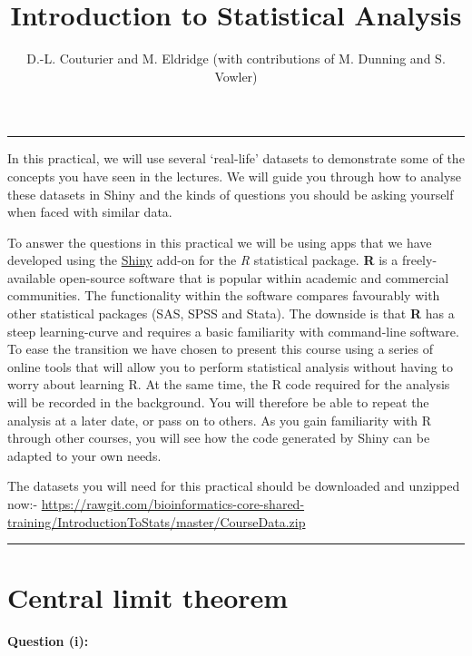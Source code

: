 \documentclass[]{article}
\title{Introduction to Statistical Analysis}
\author{D.-L. Couturier and M. Eldridge (with contributions of M. Dunning and S.
Vowler)}
\date{}
\begin{document}
\maketitle

{
\setcounter{tocdepth}{3}
\tableofcontents
}
\begin{center}\rule{0.5\linewidth}{\linethickness}\end{center}

In this practical, we will use several `real-life' datasets to
demonstrate some of the concepts you have seen in the lectures. We will
guide you through how to analyse these datasets in Shiny and the kinds
of questions you should be asking yourself when faced with similar data.

To answer the questions in this practical we will be using apps that we
have developed using the \href{http://shiny.rstudio.com/gallery/}{Shiny}
add-on for the \emph{R} statistical package. \textbf{R} is a
freely-available open-source software that is popular within academic
and commercial communities. The functionality within the software
compares favourably with other statistical packages (SAS, SPSS and
Stata). The downside is that \textbf{R} has a steep learning-curve and
requires a basic familiarity with command-line software. To ease the
transition we have chosen to present this course using a series of
online tools that will allow you to perform statistical analysis without
having to worry about learning R. At the same time, the R code required
for the analysis will be recorded in the background. You will therefore
be able to repeat the analysis at a later date, or pass on to others. As
you gain familiarity with R through other courses, you will see how the
code generated by Shiny can be adapted to your own needs.

The datasets you will need for this practical should be downloaded and
unzipped now:-
\url{https://rawgit.com/bioinformatics-core-shared-training/IntroductionToStats/master/CourseData.zip}

\begin{center}\rule{0.5\linewidth}{\linethickness}\end{center}

\hypertarget{central-limit-theorem}{%
\section{Central limit theorem}\label{central-limit-theorem}}

{\textbf{Question (i):}}
\end{document}
